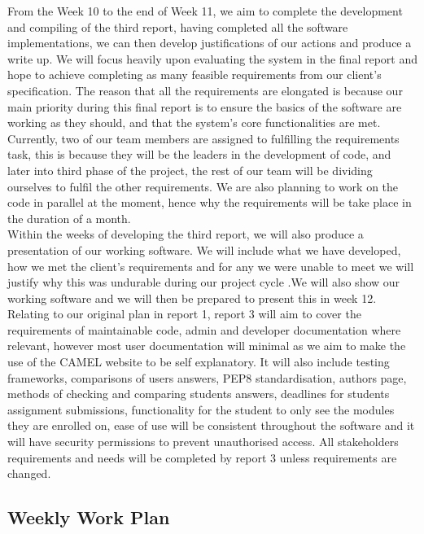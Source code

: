 From the Week 10 to the end of Week 11, we aim to complete the development and compiling of the third report, having completed all the software implementations, we can then develop justifications of our actions and produce a write up. We will focus heavily upon evaluating the system in the final report and hope to achieve completing as many feasible requirements from our client’s specification. The reason that all the requirements are elongated is because our main priority during this final report is to ensure the basics of the software are working as they should, and that the system’s core functionalities are met. Currently, two of our team members are assigned to fulfilling the requirements task, this is because they will be the leaders in the development of code, and later into third phase of the project, the rest of our team will be dividing ourselves to fulfil the other  requirements. We are also planning to work on the code in parallel at the moment, hence why the requirements will be take place in the duration of a month.\\

Within the weeks of developing the third report, we will also produce a presentation of our working software. We will include what we have developed, how we met the client's requirements and for any we were unable to meet we will justify why this was undurable during our project cycle .We will also show our working software and we will then be prepared to present this in week 12. \\

Relating to our original plan in report 1, report 3 will aim to cover the requirements of maintainable code, admin and developer documentation where relevant, however most user documentation will minimal as we aim to make the use of the CAMEL website to be self explanatory. It will also include testing frameworks, comparisons of users answers, PEP8 standardisation, authors page, methods of checking and comparing students answers, deadlines for students assignment submissions, functionality for the student to only see the modules they are enrolled on, ease of use will be consistent throughout the software and it will have security permissions to prevent unauthorised access. All stakeholders requirements and needs will be completed by report 3 unless requirements are changed.\\



\subsection*{Weekly Work Plan}

